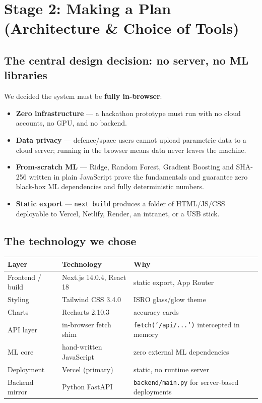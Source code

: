 \documentclass[11pt,a4paper]{article}
\newcommand{\code}[1]{\texttt{\small #1}}
\begin{document}
\section{Stage 2: Making a Plan (Architecture \& Choice of Tools)}

\subsection*{The central design decision: no server, no ML libraries}
We decided the system must be \textbf{fully in-browser}:

\begin{itemize}[leftmargin=1.5em]
  \item \textbf{Zero infrastructure} --- a hackathon prototype must run with no cloud accounts, no
        GPU, and no backend.
  \item \textbf{Data privacy} --- defence/space users cannot upload parametric data to a cloud
        server; running in the browser means data never leaves the machine.
  \item \textbf{From-scratch ML} --- Ridge, Random Forest, Gradient Boosting and SHA-256 written in
        plain JavaScript prove the fundamentals and guarantee zero black-box ML dependencies and
        fully deterministic numbers.
  \item \textbf{Static export} --- \code{next build} produces a folder of HTML/JS/CSS deployable
        to Vercel, Netlify, Render, an intranet, or a USB stick.
\end{itemize}

\subsection*{The technology we chose}
\begin{center}
\begin{tabular}{@{}lll@{}}
\toprule
\textbf{Layer} & \textbf{Technology} & \textbf{Why}\\
\midrule
Frontend / build & Next.js 14.0.4, React 18 & static export, App Router\\
Styling & Tailwind CSS 3.4.0 & ISRO glass/glow theme\\
Charts & Recharts 2.10.3 & accuracy cards\\
API layer & in-browser fetch shim & \code{fetch('/api/...')} intercepted in memory\\
ML core & hand-written JavaScript & zero external ML dependencies\\
Deployment & Vercel (primary) & static, no runtime server\\
Backend mirror & Python FastAPI & \code{backend/main.py} for server-based deployments\\
\bottomrule
\end{tabular}
\end{center}
\end{document}
